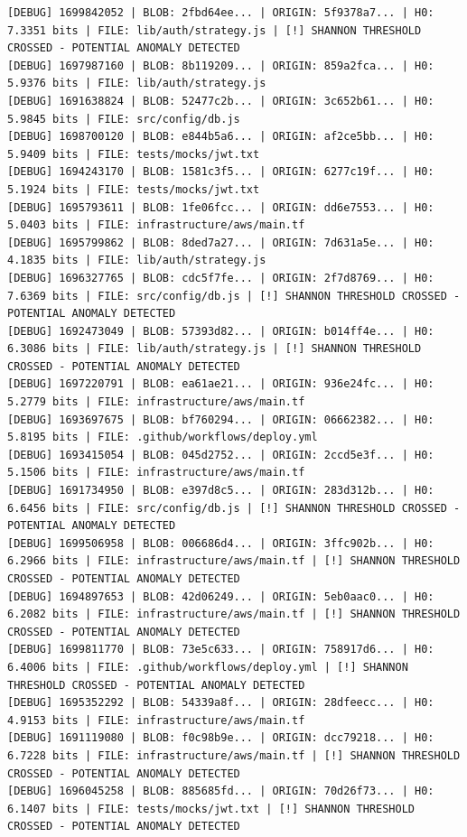 \documentclass[12pt, a4paper, oneside]{report}
\begin{document}
\begin{lstlisting}[basicstyle=\tiny\ttfamily]
[DEBUG] 1699842052 | BLOB: 2fbd64ee... | ORIGIN: 5f9378a7... | H0: 7.3351 bits | FILE: lib/auth/strategy.js | [!] SHANNON THRESHOLD CROSSED - POTENTIAL ANOMALY DETECTED
[DEBUG] 1697987160 | BLOB: 8b119209... | ORIGIN: 859a2fca... | H0: 5.9376 bits | FILE: lib/auth/strategy.js
[DEBUG] 1691638824 | BLOB: 52477c2b... | ORIGIN: 3c652b61... | H0: 5.9845 bits | FILE: src/config/db.js
[DEBUG] 1698700120 | BLOB: e844b5a6... | ORIGIN: af2ce5bb... | H0: 5.9409 bits | FILE: tests/mocks/jwt.txt
[DEBUG] 1694243170 | BLOB: 1581c3f5... | ORIGIN: 6277c19f... | H0: 5.1924 bits | FILE: tests/mocks/jwt.txt
[DEBUG] 1695793611 | BLOB: 1fe06fcc... | ORIGIN: dd6e7553... | H0: 5.0403 bits | FILE: infrastructure/aws/main.tf
[DEBUG] 1695799862 | BLOB: 8ded7a27... | ORIGIN: 7d631a5e... | H0: 4.1835 bits | FILE: lib/auth/strategy.js
[DEBUG] 1696327765 | BLOB: cdc5f7fe... | ORIGIN: 2f7d8769... | H0: 7.6369 bits | FILE: src/config/db.js | [!] SHANNON THRESHOLD CROSSED - POTENTIAL ANOMALY DETECTED
[DEBUG] 1692473049 | BLOB: 57393d82... | ORIGIN: b014ff4e... | H0: 6.3086 bits | FILE: lib/auth/strategy.js | [!] SHANNON THRESHOLD CROSSED - POTENTIAL ANOMALY DETECTED
[DEBUG] 1697220791 | BLOB: ea61ae21... | ORIGIN: 936e24fc... | H0: 5.2779 bits | FILE: infrastructure/aws/main.tf
[DEBUG] 1693697675 | BLOB: bf760294... | ORIGIN: 06662382... | H0: 5.8195 bits | FILE: .github/workflows/deploy.yml
[DEBUG] 1693415054 | BLOB: 045d2752... | ORIGIN: 2ccd5e3f... | H0: 5.1506 bits | FILE: infrastructure/aws/main.tf
[DEBUG] 1691734950 | BLOB: e397d8c5... | ORIGIN: 283d312b... | H0: 6.6456 bits | FILE: src/config/db.js | [!] SHANNON THRESHOLD CROSSED - POTENTIAL ANOMALY DETECTED
[DEBUG] 1699506958 | BLOB: 006686d4... | ORIGIN: 3ffc902b... | H0: 6.2966 bits | FILE: infrastructure/aws/main.tf | [!] SHANNON THRESHOLD CROSSED - POTENTIAL ANOMALY DETECTED
[DEBUG] 1694897653 | BLOB: 42d06249... | ORIGIN: 5eb0aac0... | H0: 6.2082 bits | FILE: infrastructure/aws/main.tf | [!] SHANNON THRESHOLD CROSSED - POTENTIAL ANOMALY DETECTED
[DEBUG] 1699811770 | BLOB: 73e5c633... | ORIGIN: 758917d6... | H0: 6.4006 bits | FILE: .github/workflows/deploy.yml | [!] SHANNON THRESHOLD CROSSED - POTENTIAL ANOMALY DETECTED
[DEBUG] 1695352292 | BLOB: 54339a8f... | ORIGIN: 28dfeecc... | H0: 4.9153 bits | FILE: infrastructure/aws/main.tf
[DEBUG] 1691119080 | BLOB: f0c98b9e... | ORIGIN: dcc79218... | H0: 6.7228 bits | FILE: infrastructure/aws/main.tf | [!] SHANNON THRESHOLD CROSSED - POTENTIAL ANOMALY DETECTED
[DEBUG] 1696045258 | BLOB: 885685fd... | ORIGIN: 70d26f73... | H0: 6.1407 bits | FILE: tests/mocks/jwt.txt | [!] SHANNON THRESHOLD CROSSED - POTENTIAL ANOMALY DETECTED

\end{lstlisting}
\end{document}
